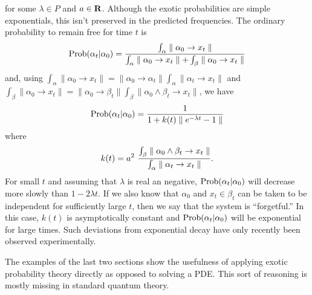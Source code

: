 \documentclass[12pt]{article}
\begin{document}
for some $\lambda\in P$ and $a\in {\bf R}$.  Although the exotic probabilities are simple 
exponentials, this isn't preserved in the predicted frequencies.  The ordinary 
probability to remain free for time $t$ is
\begin{equation}
{\rm Prob}(\alpha_t|\alpha_0) = {{\int_\alpha\parallel\alpha_0\rightarrow x_t\parallel}\over
{\int_\alpha\parallel\alpha_0\rightarrow x_t\parallel + \int_\beta\parallel\alpha_0\rightarrow x_t\parallel}}
\end{equation}
and, using 
$\int_\alpha\parallel\alpha_0\rightarrow
x_t\parallel=\parallel\alpha_0\rightarrow\alpha_t\parallel\int_\alpha\parallel\alpha_t\rightarrow x_t\parallel$ and
$\int_\beta\parallel\alpha_0\rightarrow x_t\parallel = 
\parallel\alpha_0\rightarrow\beta_t\parallel\int_\beta\parallel\alpha_0\wedge \beta_t \rightarrow x_t\parallel$,
we have
\begin{equation}
{\rm Prob}(\alpha_t|\alpha_0)={ {1}\over{1+k(t)\parallel e^{-\lambda t} - 1\parallel} }
\end{equation}
where
\begin{equation}
k(t) = a^2\ {{\int_\beta\parallel\alpha_0\wedge\beta_t\rightarrow x_t\parallel}\over{\int_\alpha\parallel\alpha_t\rightarrow
x_t\parallel}}.
\end{equation}
For small $t$ and assuming that $\lambda$ is real an negative, 
${\rm Prob}(\alpha_t|\alpha_0)$ will decrease more slowly than $1-2\lambda t$.  
If we also know that $\alpha_0$ and $x_t\in \beta_t$ can be taken to be independent for 
sufficiently large $t$, then we say that the system is ``forgetful.'' In this case, $k(t)$ 
is asymptotically constant
and ${\rm Prob}(\alpha_t|\alpha_0)$ will be exponential for large times.
Such deviations from exponential decay have only recently been observed
experimentally\cite{Wilkinson}.

    The examples of the last two sections show the usefulness of applying exotic probability 
theory directly as opposed to solving a PDE.  This sort of reasoning is mostly missing in 
standard quantum theory.
\end{document}

